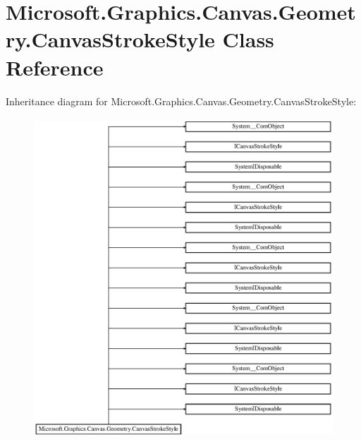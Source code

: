 \hypertarget{class_microsoft_1_1_graphics_1_1_canvas_1_1_geometry_1_1_canvas_stroke_style}{}\section{Microsoft.\+Graphics.\+Canvas.\+Geometry.\+Canvas\+Stroke\+Style Class Reference}
\label{class_microsoft_1_1_graphics_1_1_canvas_1_1_geometry_1_1_canvas_stroke_style}
Inheritance diagram for Microsoft.\+Graphics.\+Canvas.\+Geometry.\+Canvas\+Stroke\+Style\+:\begin{figure}[H]
\begin{center}
\leavevmode
\includegraphics[height=12.000000cm]{class_microsoft_1_1_graphics_1_1_canvas_1_1_geometry_1_1_canvas_stroke_style}
\end{center}
\end{figure}
